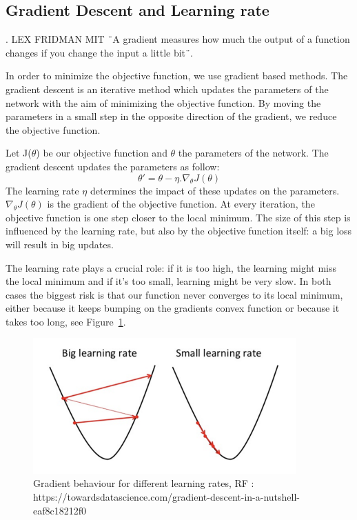 \subsection{Gradient Descent and Learning rate}
. LEX FRIDMAN MIT ¨A gradient measures how much the output of a function changes if you change the input a little bit¨.


In order to minimize the objective function, we use gradient based methods. The gradient descent is an iterative method which updates the parameters of the network with the aim of minimizing the objective function. By moving the parameters in a small step in the opposite direction of the gradient, we reduce the objective function. 

Let J(\(\theta\)) be our objective function and \(\theta\) the parameters of the network. The gradient descent updates the parameters as follow: \[\theta' = \theta - \eta . \nabla_\theta J(\theta) \] The learning rate \(\eta\) determines the impact of these updates on the parameters. \(\nabla_\theta J(\theta) \) is the gradient of the objective function. At every iteration, the objective function is one step closer to the local minimum. The size of this step is influenced by the learning rate, but also by the objective function itself: a big loss will result in big updates. 


The learning rate plays a crucial role: if it is too high, the learning might miss the local minimum and if it's too small, learning might be very slow. In both cases the biggest risk is that our function never converges to its local minimum, either because it keeps bumping on the gradients convex function or because it takes too long, see Figure~\ref{fig:LR}.  
\begin{figure}[!htp]
    \centering
        \includegraphics[width=0.9\textwidth]{./figures/02-LR}
        \caption{Gradient behaviour for different learning rates, RF : https://towardsdatascience.com/gradient-descent-in-a-nutshell-eaf8c18212f0 }\label{fig:LR}
\end{figure}

